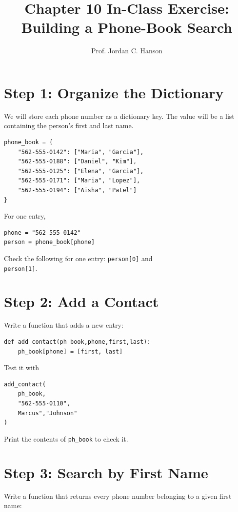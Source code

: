 \documentclass{article}
\begin{document}
\twocolumn

\title{Chapter 10 In-Class Exercise: Building a Phone-Book Search}
\author{Prof. Jordan C. Hanson}
\date{}

\maketitle

\section{Step 1: Organize the Dictionary}

We will store each phone number as a dictionary key.  The value
will be a list containing the person's first and last name.

\begin{verbatim}
phone_book = {
    "562-555-0142": ["Maria", "Garcia"],
    "562-555-0188": ["Daniel", "Kim"],
    "562-555-0125": ["Elena", "Garcia"],
    "562-555-0171": ["Maria", "Lopez"],
    "562-555-0194": ["Aisha", "Patel"]
}
\end{verbatim}
\noindent
For one entry,
\begin{verbatim}
phone = "562-555-0142"
person = phone_book[phone]
\end{verbatim}
\noindent
Check the following for one entry: \texttt{person[0]} and \\ \texttt{person[1]}.

\section{Step 2: Add a Contact}

Write a function that adds a new entry:

\begin{verbatim}
def add_contact(ph_book,phone,first,last):
    ph_book[phone] = [first, last]
\end{verbatim}
\noindent
Test it with
\begin{verbatim}
add_contact(
    ph_book,
    "562-555-0110",
    Marcus","Johnson"
)
\end{verbatim}
\noindent
Print the contents of \texttt{ph\_book} to check it.

\section{Step 3: Search by First Name}

Write a function that returns every phone number belonging to a given first name:
\end{document}
